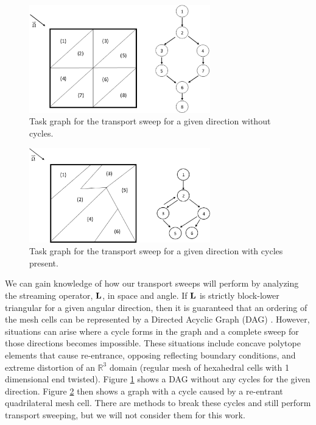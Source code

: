 \begin{figure}
\centering
\includegraphics[width=0.70\textwidth]{figures/sec_Sn/triangle_graph_nocycle.eps}
\caption{Task graph for the transport sweep for a given direction without cycles.}
\label{fig::Sn_Solution_Spatial_Sweeping_sweepNOcycle}
\end{figure}

\begin{figure}
\centering
\includegraphics[width=0.70\textwidth]{figures/sec_Sn/graph_with_cycling.eps}
\caption{Task graph for the transport sweep for a given direction with cycles present.}
\label{fig::Sn_Solution_Spatial_Sweeping_sweepWcycle}
\end{figure}

We can gain knowledge of how our transport sweeps will perform by analyzing the streaming operator, ${\bf L}$, in space and angle. If ${\bf L}$ is strictly block-lower triangular for a given angular direction, then it is guaranteed that an ordering of the mesh cells can be represented by a Directed Acyclic Graph (DAG) \cite{gerasoulis1989static}. However, situations can arise where a cycle forms in the graph and a complete sweep for those directions becomes impossible. These situations include concave polytope elements that cause re-entrance, opposing reflecting boundary conditions, and extreme distortion of an $\mathbb{R}^3$ domain (regular mesh of hexahedral cells with 1 dimensional end twisted). Figure \ref{fig::Sn_Solution_Spatial_Sweeping_sweepNOcycle} shows a DAG without any cycles for the given direction. Figure \ref{fig::Sn_Solution_Spatial_Sweeping_sweepWcycle} then shows a graph with a cycle caused by a re-entrant quadrilateral mesh cell. There are methods to break these cycles and still perform transport sweeping, but we will not consider them for this work.

